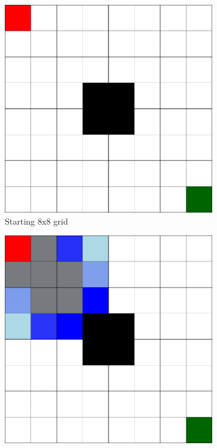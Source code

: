 \begin{figure}[h!]
  \centering
  \begin{subfigure}[b]{0.2\linewidth}
    \includegraphics[width=\linewidth]{images/simple_grid.png}
     \caption{Starting 8x8 grid}
  \end{subfigure}
  \hfill
  \begin{subfigure}[b]{0.2\linewidth}
    \includegraphics[width=\linewidth]{images/a_star_1.png}

\end{subfigure}
\end{figure}
